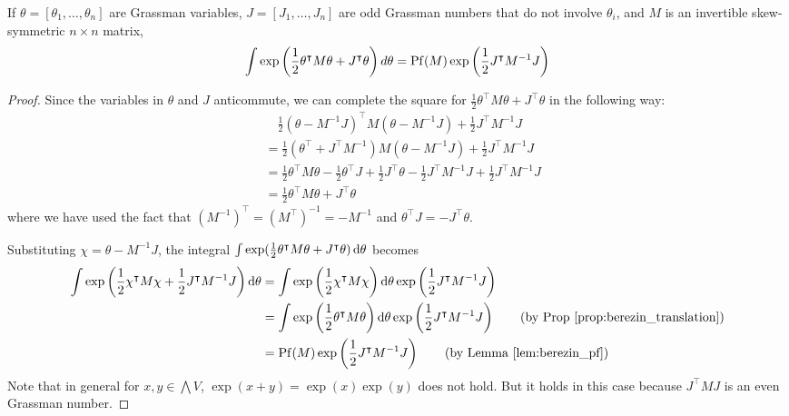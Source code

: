 \begin{prop} \label{prop:berezin_formula} %
	If $\theta = [\theta_1,\ldots,\theta_n]$ are Grassman
	variables, $J= [J_1,\ldots,J_n]$ are odd Grassman numbers that do not
	involve $\theta_i$, and $M$ is an invertible skew-symmetric  $n\times n$ matrix,
	\[
	\int \exp\paren{\frac{1}{2}\theta^{\intercal}M\theta + J^\intercal\theta} d\theta =
	\Pf(M)\exp\paren{\frac{1}{2}J^\intercal M^{-1}J}
	\]
\end{prop}
\begin{proof}
	Since the variables in $\theta$ and $J$ anticommute, we can complete the
	square for  $\frac{1}{2}\theta^{\intercal}M\theta + J^\intercal\theta$ in
	the following way:
	\begin{align*}
		&\quad\frac{1}{2}(\theta-M^{-1}J)^\intercal M (\theta - M^{-1} J) + \frac{1}{2}
		J^\intercal M^{-1}J \\
		&=\frac{1}{2}(\theta^\intercal+J^\intercal M^{-1})M (\theta 
		- M^{-1} J) + \frac{1}{2} J^\intercal M^{-1}J \\
		&= \frac{1}{2}\theta^\intercal M \theta - \frac{1}{2} \theta^\intercal J
		+\frac{1}{2}J^\intercal \theta - \frac{1}{2}J^\intercal M^{-1} J +
		\frac{1}{2} J^\intercal M^{-1} J\\
		&= \frac{1}{2}\theta^\intercal M \theta + J^\intercal \theta 
	\end{align*}
	where we have used the fact that $(M^{-1})^\intercal = (M^\intercal)^{-1} =
	-M^{-1}$ and $\theta^\intercal J = - J^\intercal \theta$. 
	 
	Substituting $\chi = \theta - M^{-1}J$, the integral $\int
	\exp(\frac{1}{2}\theta^\intercal M\theta + J^\intercal\theta)\odif{\theta}$
	becomes
	\begin{align*}
	\int \exp\paren{\frac{1}{2}\chi^\intercal M \chi + \frac{1}{2}J^\intercal
	M^{-1} J}
	\odif{\theta}
	&= \int \exp\paren{\frac{1}{2}\chi^\intercal M \chi }
	\odif{\theta} \exp\paren{\frac{1}{2}J^\intercal M^{-1} J}	\\
	&= \int \exp\paren{\frac{1}{2}\theta^\intercal M \theta }
	\odif{\theta} \exp\paren{\frac{1}{2}J^\intercal M^{-1} J}\tag{by Prop
	\ref{prop:berezin_translation}}\\
	&= \Pf(M) \exp\paren{\frac{1}{2}J^\intercal M^{-1} J} \tag{by Lemma
	\ref{lem:berezin_pf}}
	\end{align*}
	Note that in general for $x,y\in\bigwedge V$, $\exp(x+y)=\exp(x)\exp(y)$
	does not hold. But it holds in this case because $J^\intercal M J$ is an even Grassman
	number. 	
\end{proof}
